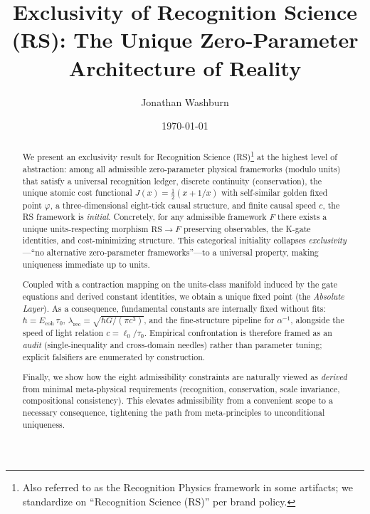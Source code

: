 \documentclass[11pt]{article}
\title{Exclusivity of Recognition Science (RS): The Unique Zero\mbox{-}Parameter Architecture of Reality}
\author{Jonathan Washburn}
\date{\today}
\begin{document}
\maketitle

\begin{abstract}
We present an exclusivity result for Recognition Science (RS)\footnote{Also referred to as the Recognition Physics framework in some artifacts; we standardize on “Recognition Science (RS)” per brand policy.} at the highest level of abstraction: among all admissible zero\mbox{-}parameter physical frameworks (modulo units) that satisfy a universal recognition ledger, discrete continuity (conservation), the unique atomic cost functional \(J(x)=\tfrac{1}{2}(x+1/x)\) with self\mbox{-}similar golden fixed point \(\varphi\), a three\mbox{-}dimensional eight\mbox{-}tick causal structure, and finite causal speed \(c\), the RS framework is \emph{initial}. Concretely, for any admissible framework \(F\) there exists a unique units\mbox{-}respecting morphism \(\mathrm{RS}\to F\) preserving observables, the K\mbox{-}gate identities, and cost\mbox{-}minimizing structure. This categorical initiality collapses \emph{exclusivity}---``no alternative zero\mbox{-}parameter frameworks''---to a universal property, making uniqueness immediate up to units.

Coupled with a contraction mapping on the units\mbox{-}class manifold induced by the gate equations and derived constant identities, we obtain a unique fixed point (the \emph{Absolute Layer}). As a consequence, fundamental constants are internally fixed without fits: \(\hbar = E_{\mathrm{coh}}\,\tau_0\), \(\lambda_{\mathrm{rec}} = \sqrt{\hbar G/(\pi c^3)}\), and the fine\mbox{-}structure pipeline for \(\alpha^{-1}\), alongside the speed of light relation \(c=\ell_0/\tau_0\). Empirical confrontation is therefore framed as an \emph{audit} (single\mbox{-}inequality and cross\mbox{-}domain needles) rather than parameter tuning; explicit falsifiers are enumerated by construction.

Finally, we show how the eight admissibility constraints are naturally viewed as \emph{derived} from minimal meta-physical requirements (recognition, conservation, scale invariance, compositional consistency). This elevates admissibility from a convenient scope to a necessary consequence, tightening the path from meta-principles to unconditional uniqueness.
\end{abstract}
\end{document}
